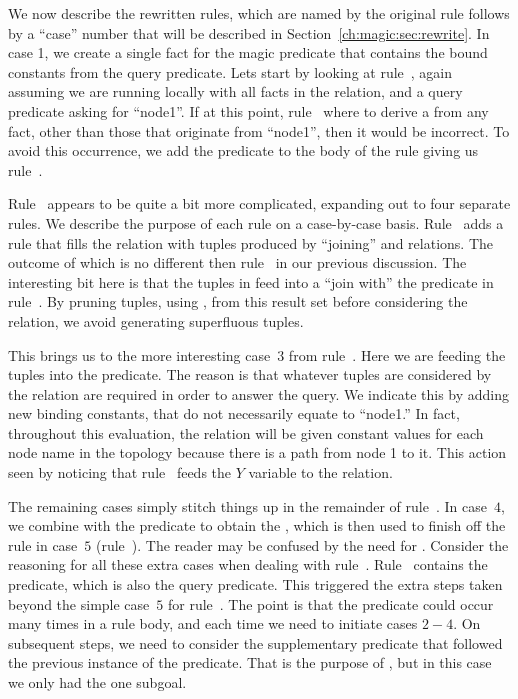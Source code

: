 We now describe the rewritten rules, which are named by the original rule
follows by a ``case'' number that will be described in
Section~\ref{ch:magic:sec:rewrite}.  In case 1, we create a single fact for the
magic predicate  that contains the bound constants from the
query predicate.  Lets start by looking at rule~, again assuming we are
running locally with all facts in the  relation, and a query predicate
asking for ``node1''.  If at this point, rule~ where to derive a 
from any  fact, other than those that originate from ``node1'', then
it would be incorrect.  To avoid this occurrence, we add the 
predicate to the body of the rule giving us rule~.

Rule~ appears to be quite a bit more complicated, expanding out to
four separate rules. We describe the purpose of each rule on a case-by-case
basis. Rule~ adds a rule that fills the  relation
with tuples produced by ``joining''  and  relations.
The outcome of which is no different then rule~ in our previous 
discussion. The interesting bit here is that the tuples in  
feed into a ``join with'' the  predicate in rule~. By pruning
tuples, using , from this result set before considering the
 relation, we avoid generating superfluous tuples. 

This brings us to the more interesting case~$3$ from rule~. Here we are
feeding the  tuples into the  predicate. The
reason is that whatever tuples are considered by the  relation are
required in order to answer the query. We indicate this by adding new binding
constants, that do not necessarily equate to ``node1.'' In fact, throughout
this evaluation, the  relation will be given constant values
for each node name in the topology because there is a path from node 1 to it.
This action seen by noticing that rule~ feeds the $Y$ variable
to the  relation.

The remaining cases simply stitch things up in the remainder of rule~.
In case~$4$, we combine  with the  predicate to obtain
the , which is then used to finish off the rule in case~$5$
(rule~).  The reader may be confused by the need for
.  Consider the reasoning for all these extra cases when dealing
with rule~.  Rule~ contains the  predicate, which is
also the query predicate.  This triggered the extra steps taken beyond the
simple case~$5$ for rule~.  The point is that the  predicate
could occur many times in a rule body, and each time we need to initiate cases
$2-4$.  On subsequent steps, we need to consider the supplementary predicate
that followed the previous instance of the  predicate.  That is the
purpose of , but in this case we only had the one 
subgoal.


